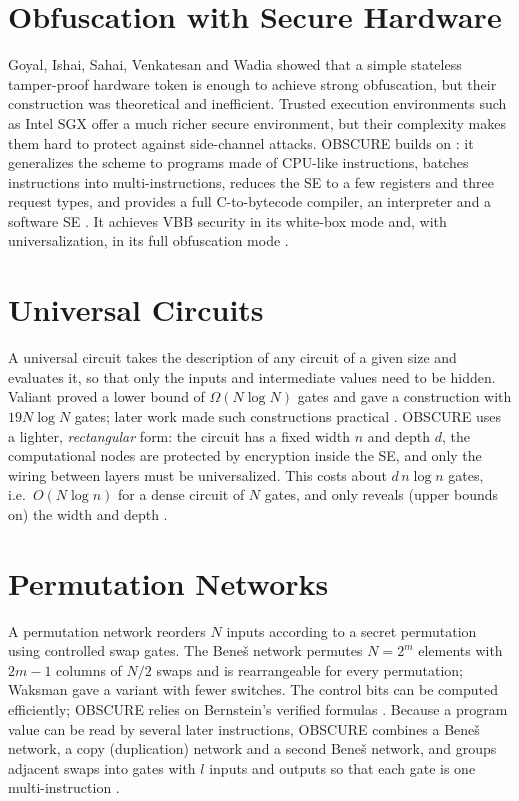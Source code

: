 \documentclass[12pt,a4paper,oneside]{report}
\begin{document}
\section{Obfuscation with Secure Hardware}
Goyal, Ishai, Sahai, Venkatesan and Wadia \cite{gis} showed that a simple stateless tamper-proof
hardware token is enough to achieve strong obfuscation, but their construction was theoretical
and inefficient. Trusted execution environments such as Intel SGX \cite{sgx} offer a much richer
secure environment, but their complexity makes them hard to protect against side-channel attacks.
OBSCURE \cite{obscure} builds on \cite{gis}: it generalizes the scheme to programs made of
CPU-like instructions, batches instructions into multi-instructions, reduces the SE to a few
registers and three request types, and provides a full C-to-bytecode compiler, an interpreter and
a software SE \cite{obscuregit}. It achieves VBB security in its white-box mode and, with
universalization, in its full obfuscation mode \cite[Thm.~1]{obscure}.

\section{Universal Circuits}
A universal circuit takes the description of any circuit of a given size and evaluates it, so that
only the inputs and intermediate values need to be hidden. Valiant \cite{valiant} proved a lower
bound of $\Omega(N\log N)$ gates and gave a construction with $19N\log N$ gates; later work made
such constructions practical \cite{ks16}. OBSCURE uses a lighter, \emph{rectangular} form: the
circuit has a fixed width $n$ and depth $d$, the computational nodes are protected by encryption
inside the SE, and only the wiring between layers must be universalized. This costs about
$d\,n\log n$ gates, i.e.\ $O(N \log n)$ for a dense circuit of $N$ gates, and only reveals (upper
bounds on) the width and depth \cite[Sec.~3.1]{obscure}.

\section{Permutation Networks}
A permutation network reorders $N$ inputs according to a secret permutation using controlled
swap gates. The Bene\v{s} network \cite{benes} permutes $N=2^m$ elements with $2m-1$ columns of
$N/2$ swaps and is rearrangeable for every permutation; Waksman \cite{waksman} gave a variant with
fewer switches. The control bits can be computed efficiently; OBSCURE relies on Bernstein's
verified formulas \cite{bernstein}. Because a program value can be read by several later
instructions, OBSCURE combines a Bene\v{s} network, a copy (duplication) network and a second
Bene\v{s} network, and groups adjacent swaps into gates with $l$ inputs and outputs so that each
gate is one multi-instruction \cite[Sec.~3.2--3.4]{obscure}.
\end{document}
